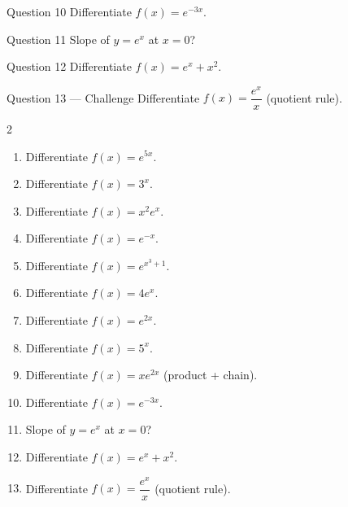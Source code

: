 \documentclass[11pt]{article}
\begin{document}
\begin{qbox}{Question 10}
Differentiate $f(x)=e^{-3x}$.\workspace{2.4cm}
\end{qbox}

\begin{qbox}{Question 11}
Slope of $y=e^x$ at $x=0$?\workspace{2.4cm}
\end{qbox}

\begin{qbox}{Question 12}
Differentiate $f(x)=e^x+x^2$.\workspace{2.4cm}
\end{qbox}

\begin{qbox}{Question 13 --- Challenge}
Differentiate $f(x)=\dfrac{e^x}{x}$ (quotient rule).\workspace{3cm}
\end{qbox}

\clearpage
{}

\begin{recapbox}
\begin{multicols}{2}
\small
\begin{enumerate}[leftmargin=*,itemsep=3pt]
  \item Differentiate $f(x)=e^{5x}$.
  \item Differentiate $f(x)=3^x$.
  \item Differentiate $f(x)=x^2 e^x$.
  \item Differentiate $f(x)=e^{-x}$.
  \item Differentiate $f(x)=e^{x^3+1}$.
  \item Differentiate $f(x)=4e^x$.
  \item Differentiate $f(x)=e^{2x}$.
  \item Differentiate $f(x)=5^x$.
  \item Differentiate $f(x)=x e^{2x}$ (product + chain).
  \item Differentiate $f(x)=e^{-3x}$.
  \item Slope of $y=e^x$ at $x=0$?
  \item Differentiate $f(x)=e^x+x^2$.
  \item Differentiate $f(x)=\dfrac{e^x}{x}$ (quotient rule).
\end{enumerate}
\end{multicols}
\end{recapbox}
\end{document}
